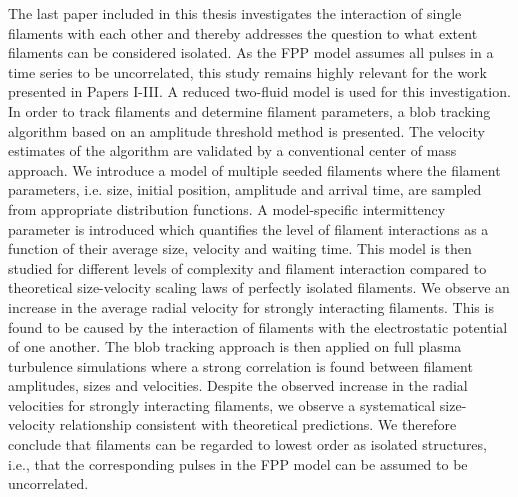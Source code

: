 The last paper included in this thesis investigates the interaction of single filaments with each other and thereby addresses the question to what extent filaments can be considered isolated. As the FPP model assumes all pulses in a time series to be uncorrelated, this study remains highly relevant for the work presented in Papers I-III. A reduced two-fluid model is used for this investigation. In order to track filaments and determine filament parameters, a blob tracking algorithm based on an amplitude threshold method is presented. The velocity estimates of the algorithm are validated by a conventional center of mass approach. We introduce a model of multiple seeded filaments where the filament parameters, i.e. size, initial position, amplitude and arrival time, are sampled from appropriate distribution functions. A model-specific intermittency parameter is introduced which quantifies the level of filament interactions as a function of their average size, velocity and waiting time. This model is then studied for different levels of complexity and filament interaction compared to theoretical size-velocity scaling laws of perfectly isolated filaments. We observe an increase in the average radial velocity for strongly interacting filaments. This is found to be caused by the interaction of filaments with the electrostatic potential of one another. The blob tracking approach is then applied on full plasma turbulence simulations where a strong correlation is found between filament amplitudes, sizes and velocities. Despite the observed increase in the radial velocities for strongly interacting filaments, we observe a systematical size-velocity relationship consistent with theoretical predictions. We therefore conclude that filaments can be regarded to lowest order as isolated structures, i.e., that the corresponding pulses in the FPP model can be assumed to be uncorrelated. 